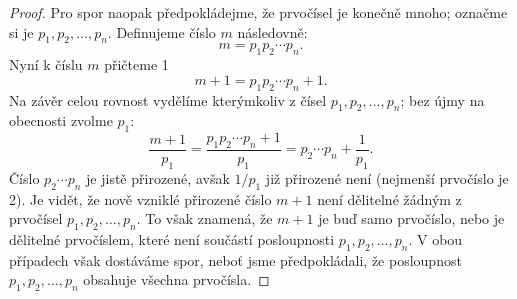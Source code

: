 \begin{proof}
    Pro spor naopak předpokládejme, že prvočísel je konečně mnoho; označme si je $p_1, p_2, \dots, p_n$. Definujeme číslo $m$ následovně:
    \begin{equation*}
        m=p_1p_2\cdots p_n.
    \end{equation*}
    Nyní k číslu $m$ přičteme 1
    \begin{equation*}
        m+1=p_1p_2\cdots p_n+1.
    \end{equation*}
    Na závěr celou rovnost vydělíme kterýmkoliv z čísel $p_1, p_2, \dots, p_n$; bez újmy na obecnosti zvolme $p_1$:
    \begin{equation*}
        \dfrac{m+1}{p_1}=\dfrac{p_1p_2\cdots p_n+1}{p_1}=p_2\cdots p_n+\dfrac{1}{p_1}.
    \end{equation*}
    Číslo $p_2\cdots p_n$ je jistě přirozené, avšak $1/p_1$ již přirozené není (nejmenší prvočíslo je 2). Je vidět, že nově vzniklé přirozené číslo $m+1$ není dělitelné žádným z prvočísel $p_1, p_2, \dots, p_n$. To však znamená, že $m+1$ je buď samo prvočíslo, nebo je dělitelné prvočíslem, které není součástí posloupnosti $p_1, p_2, \dots, p_n$. V obou případech však dostáváme spor, neboť jsme předpokládali, že posloupnost $p_1, p_2, \dots, p_n$ obsahuje všechna prvočísla.
\end{proof}

